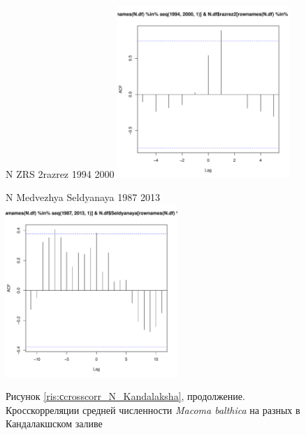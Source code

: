 \documentclass[12pt, a4paper]{disser}
\begin{document}
\begin{figure}[ht]
%
	\begin{minipage}[b]{.46\linewidth}
	\begin{center}	
	{\tiny   N ZRS 2razrez 1994 2000}
	\includegraphics[width=65mm]{../White_Sea/dynamic_N_N1/crosscorr_N_ZRS_2razrez_1994_2000.pdf}
	\end{center}
	\end{minipage}
\hfil %
	\begin{minipage}[b]{.46\linewidth}
	\begin{center}
	{\tiny  N Medvezhya Seldyanaya 1987 2013}
	\includegraphics[width=65mm]{../White_Sea/dynamic_N_N1/crosscorr_N_Medvezhya_Seldyanaya_1987_2013.pdf}
	\end{center}
	\end{minipage}
%
%

	\begin{center}
Рисунок \ref{ris:сcrosscorr_N_Kandalaksha}, продолжение. Кросскорреляции средней численности {\it Macoma balthica} на разных в Кандалакшском заливе
\end{center}
	\end{figure}
\end{document}
